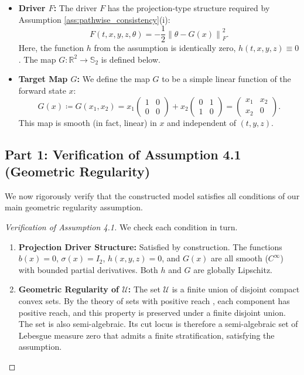 \documentclass[12pt, letterpaper]{amsart}
\newcommand{\Ucal}{\mathcal{U}}
\newcommand{\R}{\mathbb{R}}
\newcommand{\norm}[1]{\left\lVert#1\right\rVert}
\theoremstyle{plain}
\theoremstyle{definition}
\theoremstyle{remark}
\numberwithin{equation}{section} %
\begin{document}
\begin{appendices}
\begin{itemize}
    \item \textbf{Driver $F$:} The driver $F$ has the projection-type structure required by Assumption \ref{ass:pathwise_consistency}(i):
    \[ F(t,x,y,z,\theta) = -\frac{1}{2}\norm{\theta - G(x)}_F^2. \]
    Here, the function $h$ from the assumption is identically zero, $h(t,x,y,z) \equiv 0$. The map $G: \R^2 \to \mathbb{S}_2$ is defined below.

    \item \textbf{Target Map $G$:} We define the map $G$ to be a simple linear function of the forward state $x$:
    \[ G(x) \coloneqq G(x_1, x_2) = x_1 \begin{pmatrix} 1 & 0 \\ 0 & 0 \end{pmatrix} + x_2 \begin{pmatrix} 0 & 1 \\ 1 & 0 \end{pmatrix} = \begin{pmatrix} x_1 & x_2 \\ x_2 & 0 \end{pmatrix}. \]
    This map is smooth (in fact, linear) in $x$ and independent of $(t,y,z)$.
\end{itemize}

\subsection{Part 1: Verification of Assumption 4.1 (Geometric Regularity)}
We now rigorously verify that the constructed model satisfies all conditions of our main geometric regularity assumption.

\begin{proof}[Verification of Assumption 4.1]
We check each condition in turn.
\begin{enumerate}[label=(\roman*)]
    \item \textbf{Projection Driver Structure:} Satisfied by construction. The functions $b(x)=0$, $\sigma(x)=I_2$, $h(x,y,z)=0$, and $G(x)$ are all smooth ($C^\infty$) with bounded partial derivatives. Both $h$ and $G$ are globally Lipschitz.

    \item \textbf{Geometric Regularity of $\Ucal$:} The set $\Ucal$ is a finite union of disjoint compact convex sets. By the theory of sets with positive reach \cite[Theorem 4.8]{Federer1959}, each component has positive reach, and this property is preserved under a finite disjoint union. The set is also semi-algebraic. Its cut locus is therefore a semi-algebraic set of Lebesgue measure zero that admits a finite stratification, satisfying the assumption.


\end{enumerate}
\end{proof}
\end{appendices}
\end{document}
